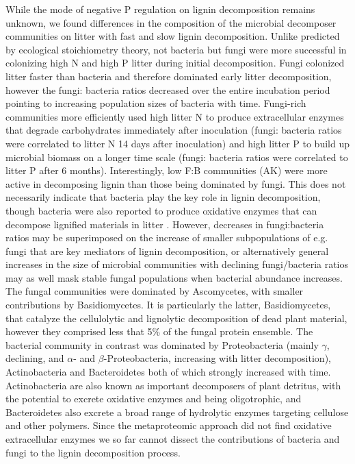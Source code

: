 While the mode of negative P regulation on lignin decomposition remains unknown, we found differences in the composition of the microbial decomposer communities on litter with fast and slow lignin decomposition. Unlike predicted by ecological stoichiometry theory, not bacteria but fungi were more successful in colonizing high N and high P litter during initial decomposition. Fungi colonized litter faster than bacteria and therefore dominated early litter decomposition, however the fungi: bacteria ratios decreased over the entire incubation period pointing to increasing population sizes of bacteria with time. Fungi-rich communities more efficiently used high litter N to produce extracellular enzymes that degrade carbohydrates immediately after inoculation (fungi: bacteria ratios were correlated to litter N 14 days after inoculation) and high litter P to build up microbial biomass on a longer time scale (fungi: bacteria ratios were correlated to litter P after 6 months). Interestingly, low F:B communities (AK) were more active in decomposing lignin than those being dominated by fungi. This does not necessarily indicate that bacteria play the key role in lignin decomposition, though bacteria were also reported to produce oxidative enzymes that can decompose lignified materials in litter \cite{Bugg2011}. However, decreases in fungi:bacteria ratios may be superimposed on the increase of smaller subpopulations of e.g. fungi that are key mediators of lignin decomposition, or alternatively general increases in the size of microbial communities with declining fungi/bacteria ratios may as well mask stable fungal populations when  bacterial abundance increases. The fungal communities were dominated by Ascomycetes, with smaller contributions by Basidiomycetes. It is particularly the latter, Basidiomycetes, that catalyze the cellulolytic and lignolytic decomposition of dead plant material, however they comprised less that 5\% of the fungal protein ensemble. The bacterial community in contrast was dominated by Proteobacteria (mainly $\gamma$, declining, and $\alpha$- and $\beta$-Proteobacteria, increasing with litter decomposition), Actinobacteria and Bacteroidetes both of which strongly increased with time. Actinobacteria are also known as important decomposers of plant detritus, with the potential to excrete oxidative enzymes and being oligotrophic, and Bacteroidetes also excrete a broad range of hydrolytic enzymes targeting cellulose and other polymers. Since the metaproteomic approach did not find oxidative extracellular enzymes we so far cannot dissect the contributions of bacteria and fungi to the lignin decomposition process. 

